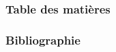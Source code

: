 
\begin{frame}
	\titlepage
\end{frame}

\begin{frame}
	\frametitle{Table des matières}
	\tableofcontents[hideothersubsections]
\end{frame}

%


\begin{frame}[allowframebreaks]
	\frametitle{Bibliographie}
	
\end{frame}

